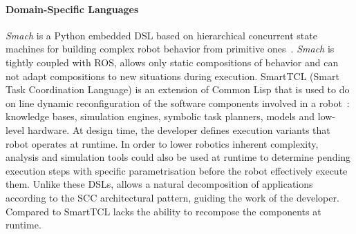 \paragraph*{Domain-Specific Languages}

\emph{Smach} is a Python embedded DSL based on hierarchical concurrent
state machines for building complex robot behavior from primitive
ones~\cite{Boren10a}. \emph{Smach} is tightly coupled with ROS, allows
only static compositions of behavior and can not adapt compositions to
new situations during execution. SmartTCL (Smart Task Coordination
Language) is an extension of Common Lisp that is used to do on line
dynamic reconfiguration of the software components involved in a
robot~\cite{Stec11a}: knowledge bases, simulation engines, symbolic
task planners, models and low-level hardware. At design time, the
developer defines execution variants that robot operates at runtime.
In order to lower robotics inherent complexity, analysis and
simulation tools could also be used at runtime to determine pending
execution steps with specific parametrisation before the robot
effectively execute them. Unlike these DSLs, \diaspec{} allows a
natural decomposition of applications according to the SCC
architectural pattern, guiding the work of the developer. Compared to
SmartTCL \diaspec{} lacks the ability to recompose the components at
runtime.

